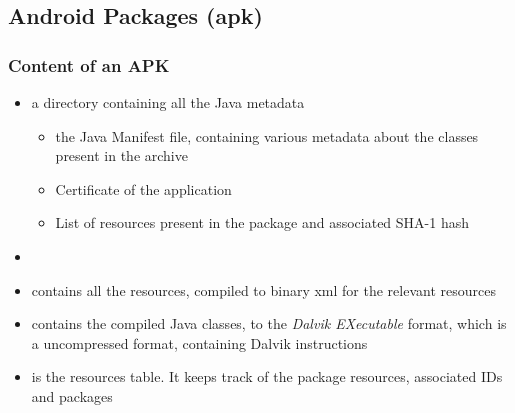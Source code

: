 \subsection{Android Packages (apk)}

\begin{frame}
  \frametitle{Content of an APK}
  \begin{itemize}
  \item {} a directory containing all the Java metadata
    \begin{itemize}
    \item {} the Java Manifest file, containing
      various metadata about the classes present in the archive
    \item {} Certificate of the application
    \item {} List of resources present in the package and
      associated SHA-1 hash
    \end{itemize}
  \item {}
  \item {} contains all the resources, compiled to binary xml
    for the relevant resources
  \item {} contains the compiled Java classes, to the
    \emph{Dalvik EXecutable} format, which is a uncompressed format,
    containing Dalvik instructions
  \item {} is the resources table. It keeps track
    of the package resources, associated IDs and packages
  \end{itemize}
\end{frame}

